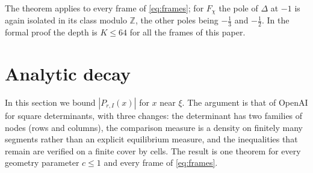 \documentclass[11pt]{amsart}
\theoremstyle{definition}
\theoremstyle{remark}
\numberwithin{equation}{section}
\newcommand{\Z}{\mathbb Z}
\begin{document}
The theorem applies to every frame of \eqref{eq:frames}; for $F_\chi$ the pole of $\Delta$ at $-1$ is again isolated in its
class modulo $\Z$, the other poles being $-\frac13$ and $-\frac12$. In the formal proof the depth is $K\le64$ for all the
frames of this paper.

\section{Analytic decay}\label{sec:decay}

In this section we bound $|P_{r,I}(x)|$ for $x$ near $\xi$. The argument is that of OpenAI \cite{OpenAI2026} for
square determinants, with three changes: the determinant has two families of nodes (rows and columns), the
comparison measure is a density on finitely many segments rather than an explicit equilibrium measure, and the
inequalities that remain are verified on a finite cover by cells. The result is one theorem for every geometry
parameter $c\le1$ and every frame of \eqref{eq:frames}.
\end{document}
